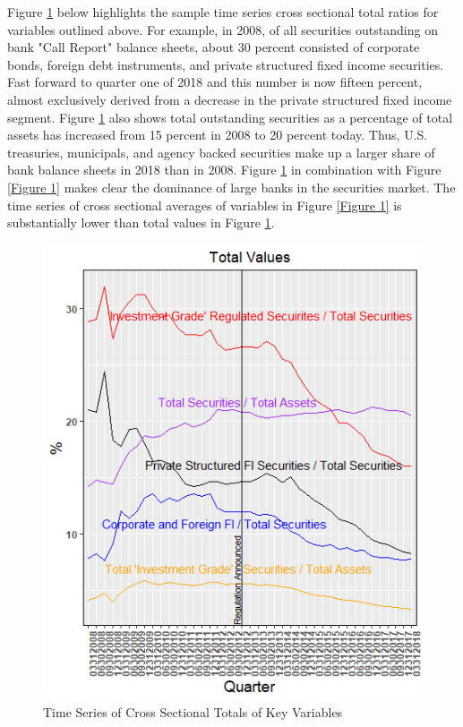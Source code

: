 \documentclass[preprint,12pt]{elsarticle}
\begin{document}
Figure \ref{Figure 2} below highlights the sample time series cross sectional total ratios for variables outlined above.  For example, in 2008, of all securities outstanding on bank "Call Report" balance sheets, about 30 percent consisted of corporate bonds, foreign debt instruments, and private structured fixed income securities.  Fast forward to quarter one of 2018 and this number is now fifteen percent, almost exclusively derived from a decrease in the private structured fixed income segment.  Figure \ref{Figure 2} also shows total outstanding securities as a percentage of total assets has increased from 15 percent in 2008 to 20 percent today. Thus, U.S. treasuries, municipals, and agency backed securities make up a larger share of bank balance sheets in 2018 than in 2008.  Figure \ref{Figure 2} in combination with Figure \ref{Figure 1} makes clear the dominance of large banks in the securities market.  The time series of cross sectional averages of variables in Figure \ref{Figure 1} is substantially lower than total values in Figure \ref{Figure 2}. 
\begin{figure}[h!]
\centering
\caption{Time Series of Cross Sectional Totals of Key Variables}
\label{Figure 2}
\includegraphics[width = .69\linewidth]{Rplot01}
\end{figure}
\end{document}
